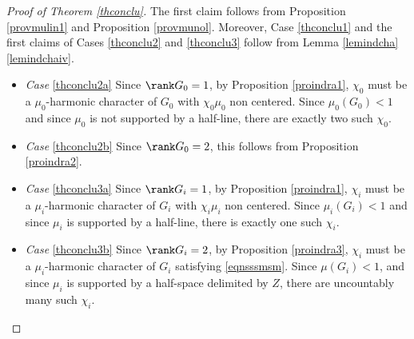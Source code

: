 \begin{proof}[Proof of Theorem \ref{thconclu}]
The first claim follows from
Proposition \ref{provmulin1} and Proposition \ref{provmunol}. Moreover, Case \eqref{thconclu1}
and
the first claims of Cases \eqref{thconclu2} and \eqref{thconclu3} follow from Lemma \ref{lemindcha}\,\eqref{lemindchaiv}.
\begin{itemize}
\item
\emph{Case} \eqref{thconclu2a} Since $\rank G_0=1$,
by Proposition \ref{proindra1}, $\chi_0$ must be a $\mu_0$-harmonic character
of $G_0$ with $\chi_0\mu_0$ non centered.
Since $\mu_0(G_0)<1$ and since $\mu_0$ is not supported by a half-line,
there are exactly two such $\chi_0$.
\item
\emph{Case} \eqref{thconclu2b} Since $\rank G_0=2$, this follows from Proposition \ref{proindra2}.
\item
\emph{Case} \eqref{thconclu3a} Since $\rank G_i=1$,
by Proposition \ref{proindra1},
$\chi_i$ must be a $\mu_i$-harmonic character of $G_i$
with $\chi_i\mu_i$ non centered.
Since $\mu_i(G_i)<1$ and since $\mu_i$ is supported by a half-line,
there is exactly one such $\chi_i$.
\item
\emph{Case} \eqref{thconclu3b} Since $\rank G_i=2$,
by Proposition \ref{proindra3}, $\chi_i$
must be a $\mu_i$-harmonic character of $G_i$
satisfying \eqref{eqnsssmsm}.
Since $\mu(G_i)<1$, and since $\mu_i$ is supported
by a half-space delimited by $Z$,
there are uncountably many such $\chi_i$.\qedhere
\end{itemize}
\end{proof}

